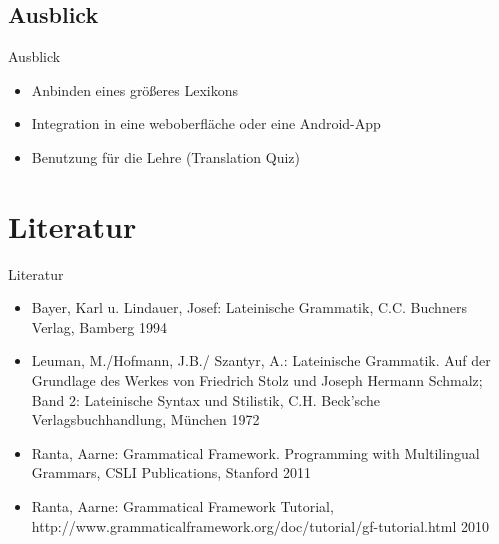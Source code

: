 \documentclass{beamer}
\begin{document}
\subsection{Ausblick}
\begin{frame}{Ausblick}
\begin{itemize}
\item Anbinden eines größeres Lexikons
\item Integration in eine weboberfläche oder eine Android-App
\item Benutzung für die Lehre (Translation Quiz)
\end{itemize}
\end{frame}
\section{Literatur}
\begin{frame}{Literatur}
\begin{itemize}
  \item Bayer, Karl u. Lindauer, Josef: Lateinische Grammatik, C.C. Buchners Verlag, Bamberg 1994
  \item Leuman, M./Hofmann, J.B./ Szantyr, A.: Lateinische Grammatik. Auf der Grundlage des Werkes von Friedrich Stolz und Joseph Hermann Schmalz; Band 2: Lateinische Syntax und Stilistik, C.H. Beck'sche Verlagsbuchhandlung, München 1972
  \item Ranta, Aarne: Grammatical Framework. Programming with Multilingual Grammars, CSLI Publications, Stanford 2011 
  \item Ranta, Aarne: Grammatical Framework Tutorial, http://www.grammaticalframework.org/doc/tutorial/gf-tutorial.html 2010
\end{itemize}
\end{frame}
\end{document}
